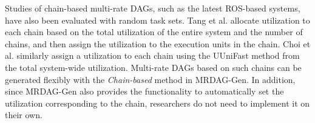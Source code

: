 Studies of chain-based multi-rate DAGs, such as the latest ROS-based systems, have also been evaluated with random task sets.
Tang et al. \cite{tang2020response} allocate utilization to each chain based on the total utilization of the entire system and the number of chains, and then assign the utilization to the execution units in the chain.
Choi et al. \cite{choi2021picas} similarly assign a utilization to each chain using the UUniFast method from the total system-wide utilization.
Multi-rate DAGs based on such chains can be generated flexibly with the {\it Chain-based} method in MRDAG-Gen.
In addition, since MRDAG-Gen also provides the functionality to automatically set the utilization corresponding to the chain, researchers do not need to implement it on their own.
